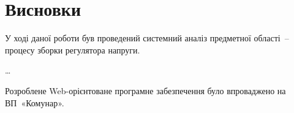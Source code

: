 \section*{Висновки}

У ході даної роботи був проведений системний аналіз предметної області~-- 
процесу зборки регулятора напруги. 

\ldots 

Розроблене Web-орієнтоване програмне забезпечення було впроваджено на ВП~«Комунар».
